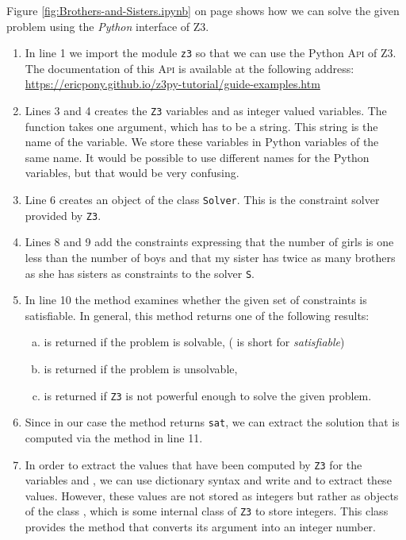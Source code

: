 \noindent
Figure \ref{fig:Brothers-and-Sisters.ipynb} on page \pageref{fig:Brothers-and-Sisters.ipynb} shows how we can
solve the given problem using the \textsl{Python}
interface of Z3.
\begin{enumerate}
\item In line 1 we import the module \texttt{z3} so that we can use the Python \textsc{Api} of Z3.
      The documentation of this \textsc{Api} is available at the following address:
      \\[0.2cm]
      \hspace*{1.3cm}
      \href{https://ericpony.github.io/z3py-tutorial/guide-examples.htm}{https://ericpony.github.io/z3py-tutorial/guide-examples.htm}
\item Lines 3 and 4 creates the \texttt{Z3} variables  and  as integer valued variables.
      The function  takes one argument, which has to be a string.  This string is the name of the
      variable.  We store these variables in Python variables of the same name.  It would be possible to use
      different names for the Python variables, but that would be very confusing.
\item Line 6 creates an object of the class \texttt{Solver}.  This is the constraint solver provided by
      \texttt{Z3}.
\item Lines 8 and 9 add the constraints expressing that the number of girls is one less than the number of boys
      and that my sister has twice as many brothers as she has sisters as constraints to the solver
      \texttt{S}.
\item In line 10 the method  examines whether the given set of constraints is satisfiable.
      In general, this method returns one of the following results:
      \begin{enumerate}[(a)]
      \item {} is returned if the problem is solvable, ( is short for \emph{satisfiable})
      \item {} is returned if the problem is unsolvable,
      \item {} is returned if \texttt{Z3} is not powerful enough to solve the given problem.
      \end{enumerate}
\item Since in our case the method  returns \texttt{sat}, we can extract the solution that is
      computed via the method  in line 11.  
\item In order to extract the values that have been computed by \texttt{Z3} for the variables  and
      , we can use dictionary syntax and write  and
       to extract these values.  However, these values are not stored as integers but
      rather as objects of the class , which is some internal class of \texttt{Z3} to store
      integers.  This class provides the method  that converts its argument into an integer number.
\end{enumerate}
\pagebreak

